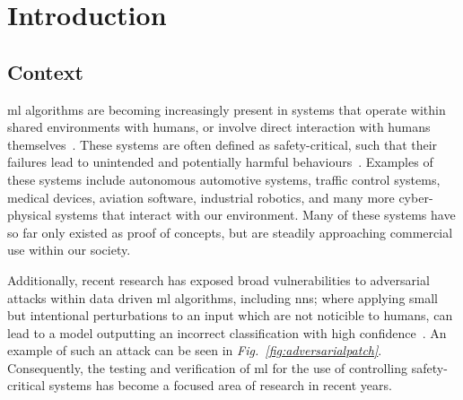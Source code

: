 
\chapter{Introduction} %
\label{Chapter1} %



\section{Context}

\Gls{ml} algorithms are becoming increasingly present in systems that operate within shared environments
with humans, or involve direct interaction with humans themselves~\citep{pereira}. These systems 
are often defined as safety-critical, such that their failures lead to unintended and potentially harmful behaviours~\citep{amodei}.
Examples of these systems include autonomous automotive systems, traffic control systems, medical devices, aviation software,
industrial robotics, and many more cyber-physical systems that interact with our environment.
Many of these systems have so far only existed as proof of concepts, but are steadily approaching commercial use within our society.

Additionally, recent research has exposed broad vulnerabilities to adversarial attacks within data driven \gls{ml} algorithms,
including \Glspl{nn}; where applying small but intentional perturbations to an input which are not noticible to humans,
can lead to a model outputting an incorrect classification with high confidence~\citep{goodfellow}.
An example of such an attack can be seen in \textit{Fig.~\ref{fig:adversarialpatch}}.
Consequently, the testing and verification of \gls{ml} for the use of controlling safety-critical systems has become a focused area of research in recent years.

